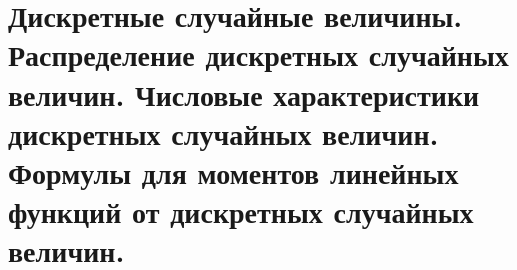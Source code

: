 \documentclass[polytech/stats/exam-2023/stats-exam-2023.tex]{subfiles}
\begin{document}
\section{Дискретные случайные величины. Распределение дискретных случайных величин. Числовые характеристики дискретных случайных величин. Формулы для моментов линейных функций от дискретных случайных величин.}
\end{document}
